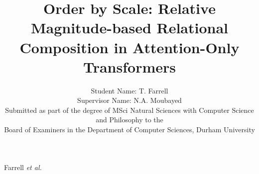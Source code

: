 \documentclass[10pt,journal,compsoc]{IEEEtran}
\begin{document}
%
\title{
Order by Scale: Relative Magnitude-based Relational Composition in Attention-Only Transformers
}
%
%

\author{Student Name: T. Farrell\\
Supervisor Name: N.A. Moubayed\\
Submitted as part of the degree of MSci Natural Sciences with Computer Science and Philosophy to the\\
Board of Examiners in the Department of Computer Sciences, Durham University
}


%
{Farrell \MakeLowercase{\textit{et al.}}}



\maketitle
\end{document}
